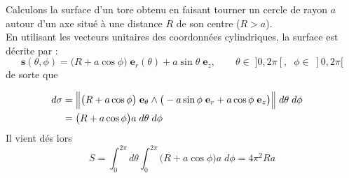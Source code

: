 \documentclass[a4paper]{article}
\begin{document}
\begin{itemize}
\begin{center}
\end{center}

Calculons la surface d'un tore obtenu en faisant tourner un cercle de rayon $ a $ autour d'un axe situé à une distance $ R $ de son centre ($ R > a $). \\
En utilisant les vecteurs unitaires des coordonnées cylindriques, la surface est décrite par : 
\[ \textbf{s}(\theta, \phi) = \big( R + a \cos \phi \big) \; \textbf{e}_r(\theta) + a \sin \theta \; \textbf{e}_z, \qquad \theta \in \; ]0, 2 \pi[, \; \; \phi \in \; ]0, 2 \pi[ \]
de sorte que 

\begin{align*}
d \sigma &= \Big\| \big( R + a \cos \phi \big) \; \textbf{e}_\theta \wedge \big( - a \sin \phi \; \textbf{e}_r + a \cos \phi \; \textbf{e}_z \big) \Big\| \; d \theta \; d \phi \cr
&= \big( R + a \cos \phi \big) a \; d \theta \; d \phi
\end{align*}
Il vient dés lors 
\[ S = \int_0^{2 \pi} d \theta \int_0^{2 \pi} \big( R + a \cos \phi \big) a \; d \phi = 4 \pi^2 R a \]











\end{itemize}
\end{document}
